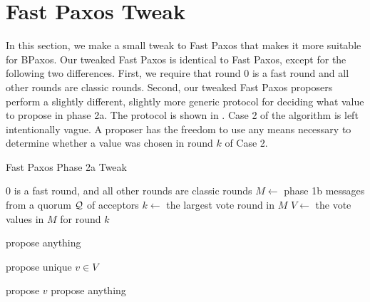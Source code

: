 \section{Fast Paxos Tweak}
In this section, we make a small tweak to Fast Paxos that makes it more
suitable for BPaxos. Our tweaked Fast Paxos is identical to Fast Paxos, except
for the following two differences. First, we require that round $0$ is a fast
round and all other rounds are classic rounds. Second, our tweaked Fast Paxos
proposers perform a slightly different, slightly more generic protocol for
deciding what value to propose in phase 2a. The protocol is shown in
. Case 2 of the algorithm is left intentionally vague.
A proposer has the freedom to use any means necessary to determine whether a
value was chosen in round $k$ of Case 2.

\begin{algorithm}[ht]
  \caption{Fast Paxos Phase 2a Tweak}%
  \begin{algorithmic}[1]
    \Require{} $0$ is a fast round, and all other rounds are classic rounds
    \State $M \gets$ phase 1b messages from a quorum $\mathcal{Q}$ of acceptors
    \State $k \gets$ the largest vote round in $M$
    \State $V \gets$ the vote values in $M$ for round $k$

      \State propose anything
    \EndIf{}

      \State propose unique $v \in V$
    \EndIf{}

      \State propose $v$
    \Else{}
      \State propose anything
    \EndIf{}
  \end{algorithmic}
\end{algorithm}

